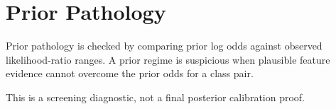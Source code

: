 \section{Prior Pathology}

Prior pathology is checked by comparing prior log odds against observed likelihood-ratio ranges. A prior regime is suspicious when plausible feature evidence cannot overcome the prior odds for a class pair.

This is a screening diagnostic, not a final posterior calibration proof.

